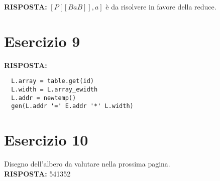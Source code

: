 \documentclass[a4paper]{article}
\begin{document}
\textbf{RISPOSTA:} $[P[\![BaB]\!],a]$ è da risolvere in favore della reduce.

\section*{Esercizio 9}

\textbf{RISPOSTA:}
\begin{lstlisting}
  L.array = table.get(id)
  L.width = L.array_ewidth
  L.addr = newtemp()
  gen(L.addr '=' E.addr '*' L.width)
\end{lstlisting}

\section*{Esercizio 10}

\begin{figure}
  \centering
\end{figure}

Disegno dell'albero da valutare nella prossima pagina.\\
\textbf{RISPOSTA:} 541352
\end{document}

